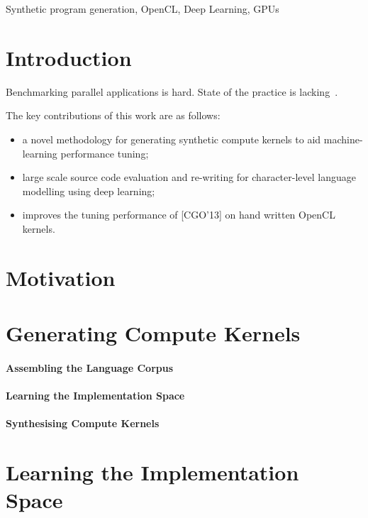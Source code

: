 \documentclass[preprint,nonatbib,10pt,nocopyrightspace]{sigplanconf}
\begin{document}

\keywords
Synthetic program generation, %
OpenCL, %
Deep Learning, %
GPUs

\section{Introduction}\label{sec:introduction}

Benchmarking parallel applications is hard. State of the practice is
lacking~\cite{Belli2015}.

The key contributions of this work are as follows:%
\begin{itemize}
\item a novel methodology for generating synthetic compute kernels to
  aid machine-learning performance tuning;
\item large scale source code evaluation and re-writing for
  character-level language modelling using deep learning;
\item improves the tuning performance of [CGO'13] on hand written
  OpenCL kernels.
\end{itemize}


\section{Motivation}\label{sec:motivation}


\section{Generating Compute Kernels}\label{sec:}


\paragraph{Assembling the Language Corpus}


\paragraph{Learning the Implementation Space}


\paragraph{Synthesising Compute Kernels}


\section{Learning the Implementation Space}\label{sec:ml}
\end{document}
